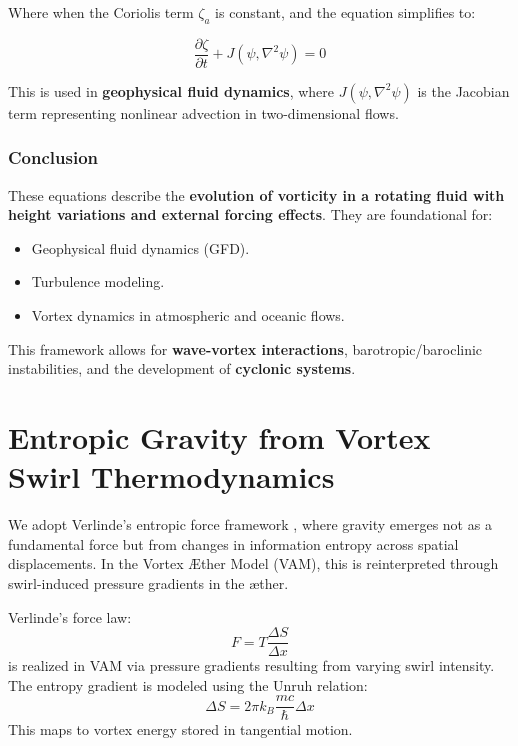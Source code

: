 \documentclass[a4paper,12pt]{article}
\begin{document}
    Where when the Coriolis term $\zeta_a$ is constant, and the equation simplifies to:

    \begin{eqbox}
    \begin{equation}
        \frac{\partial \zeta}{\partial t}+J(\psi, \nabla^2 \psi)=0
    \end{equation}
    \end{eqbox}

    This is used in \textbf{geophysical fluid dynamics}, where $J(\psi, \nabla^2 \psi)$ is the Jacobian term representing nonlinear advection in
    two-dimensional flows.

    \subsubsection*{Conclusion}
    These equations describe the \textbf{evolution of vorticity in a rotating fluid with height variations and external forcing effects}. They are foundational for:
    \begin{itemize}
        \item Geophysical fluid dynamics (GFD).
        \item Turbulence modeling.
        \item Vortex dynamics in atmospheric and oceanic flows.
    \end{itemize}
    This framework allows for \textbf{wave-vortex interactions}, barotropic/baroclinic instabilities, and the development of \textbf{cyclonic systems}.


        \section{Entropic Gravity from Vortex Swirl Thermodynamics}

    We adopt Verlinde’s entropic force framework \cite{verlinde2010emergent}, where gravity emerges not as a fundamental force but from changes in information entropy across spatial displacements. In the Vortex Æther Model (VAM), this is reinterpreted through swirl-induced pressure gradients in the æther.

    Verlinde's force law:
    \[
        F = T \frac{\Delta S}{\Delta x}
    \]
    is realized in VAM via pressure gradients resulting from varying swirl intensity. The entropy gradient is modeled using the Unruh relation:
    \[
        \Delta S = 2\pi k_B \frac{mc}{\hbar} \Delta x
    \]
    This maps to vortex energy stored in tangential motion.
\end{document}
